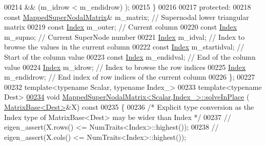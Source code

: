 \begin{DoxyCode}
00214                 && (m\_idrow < m\_endidrow) );
00215     \}
00216     
00217   \textcolor{keyword}{protected}:
00218     \textcolor{keyword}{const} \hyperlink{group___sparse_l_u___module_class_eigen_1_1internal_1_1_mapped_super_nodal_matrix}{MappedSuperNodalMatrix}& m\_matrix; \textcolor{comment}{// Supernodal lower triangular matrix }
00219     \textcolor{keyword}{const} \hyperlink{namespace_eigen_a62e77e0933482dafde8fe197d9a2cfde}{Index} m\_outer;                    \textcolor{comment}{// Current column }
00220     \textcolor{keyword}{const} \hyperlink{namespace_eigen_a62e77e0933482dafde8fe197d9a2cfde}{Index} m\_supno;                    \textcolor{comment}{// Current SuperNode number}
00221     \hyperlink{namespace_eigen_a62e77e0933482dafde8fe197d9a2cfde}{Index} m\_idval;                          \textcolor{comment}{// Index to browse the values in the current column}
00222     \textcolor{keyword}{const} \hyperlink{namespace_eigen_a62e77e0933482dafde8fe197d9a2cfde}{Index} m\_startidval;               \textcolor{comment}{// Start of the column value}
00223     \textcolor{keyword}{const} \hyperlink{namespace_eigen_a62e77e0933482dafde8fe197d9a2cfde}{Index} m\_endidval;                 \textcolor{comment}{// End of the column value}
00224     \hyperlink{namespace_eigen_a62e77e0933482dafde8fe197d9a2cfde}{Index} m\_idrow;                          \textcolor{comment}{// Index to browse the row indices }
00225     \hyperlink{namespace_eigen_a62e77e0933482dafde8fe197d9a2cfde}{Index} m\_endidrow;                       \textcolor{comment}{// End index of row indices of the current column}
00226 \};
00227 
00232 \textcolor{keyword}{template}<\textcolor{keyword}{typename} Scalar, \textcolor{keyword}{typename} Index\_>
00233 \textcolor{keyword}{template}<\textcolor{keyword}{typename} Dest>
\hyperlink{group___sparse_l_u___module_ab93581127fd87b6bc467b6f67fcf4eeb}{00234} \textcolor{keywordtype}{void} \hyperlink{group___sparse_l_u___module_ab93581127fd87b6bc467b6f67fcf4eeb}{MappedSuperNodalMatrix<Scalar,Index\_>::solveInPlace}
      ( \hyperlink{group___core___module_class_eigen_1_1_matrix_base}{MatrixBase<Dest>}&X)\textcolor{keyword}{ const}
00235 \textcolor{keyword}{}\{
00236     \textcolor{comment}{/* Explicit type conversion as the Index type of MatrixBase<Dest> may be wider than Index */}
00237 \textcolor{comment}{//    eigen\_assert(X.rows() <= NumTraits<Index>::highest());}
00238 \textcolor{comment}{//    eigen\_assert(X.cols() <= NumTraits<Index>::highest());}

\end{DoxyCode}
